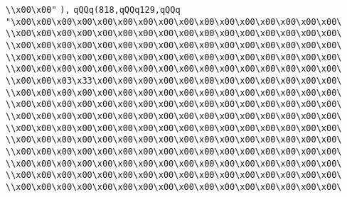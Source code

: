 \verb|\\x00\x00"|\newline
\verb|),|\newline
\verb|qQQq(818,qQQq129,qQQq|\newline
\verb|"\x00\x00\x00\x00\x00\x00\x00\x00\x00\x00\x00\x00\x00\x00\x00\x00\|\newline
\verb|\\x00\x00\x00\x00\x00\x00\x00\x00\x00\x00\x00\x00\x00\x00\x00\x00\|\newline
\verb|\\x00\x00\x00\x00\x00\x00\x00\x00\x00\x00\x00\x00\x00\x00\x00\x00\|\newline
\verb|\\x00\x00\x00\x00\x00\x00\x00\x00\x00\x00\x00\x00\x00\x00\x00\x00\|\newline
\verb|\\x00\x00\x00\x00\x00\x00\x00\x00\x00\x00\x00\x00\x00\x00\x00\x00\|\newline
\verb|\\x00\x00\x03\x33\x00\x00\x00\x00\x00\x00\x00\x00\x00\x00\x00\x00\|\newline
\verb|\\x00\x00\x00\x00\x00\x00\x00\x00\x00\x00\x00\x00\x00\x00\x00\x00\|\newline
\verb|\\x00\x00\x00\x00\x00\x00\x00\x00\x00\x00\x00\x00\x00\x00\x00\x00\|\newline
\verb|\\x00\x00\x00\x00\x00\x00\x00\x00\x00\x00\x00\x00\x00\x00\x00\x00\|\newline
\verb|\\x00\x00\x00\x00\x00\x00\x00\x00\x00\x00\x00\x00\x00\x00\x00\x00\|\newline
\verb|\\x00\x00\x00\x00\x00\x00\x00\x00\x00\x00\x00\x00\x00\x00\x00\x00\|\newline
\verb|\\x00\x00\x00\x00\x00\x00\x00\x00\x00\x00\x00\x00\x00\x00\x00\x00\|\newline
\verb|\\x00\x00\x00\x00\x00\x00\x00\x00\x00\x00\x00\x00\x00\x00\x00\x00\|\newline
\verb|\\x00\x00\x00\x00\x00\x00\x00\x00\x00\x00\x00\x00\x00\x00\x00\x00\|\newline
\verb|\\x00\x00\x00\x00\x00\x00\x00\x00\x00\x00\x00\x00\x00\x00\x00\x00\|\newline
